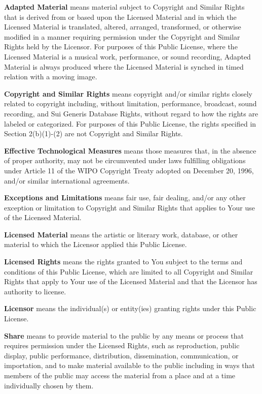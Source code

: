 \begin{doclicense@enumerate}
\item \textbf{Adapted Material} means material subject to Copyright and Similar Rights that is derived from or based upon the Licensed Material and in which the Licensed Material is translated, altered, arranged, transformed, or otherwise modified in a manner requiring permission under the Copyright and Similar Rights held by the Licensor. For purposes of this Public License, where the Licensed Material is a musical work, performance, or sound recording, Adapted Material is always produced where the Licensed Material is synched in timed relation with a moving image.
\item \textbf{Copyright and Similar Rights} means copyright and/or similar rights closely related to copyright including, without limitation, performance, broadcast, sound recording, and Sui Generis Database Rights, without regard to how the rights are labeled or categorized. For purposes of this Public License, the rights specified in Section 2(b)(1)-(2) are not Copyright and Similar Rights.
\item \textbf{Effective Technological Measures} means those measures that, in the absence of proper authority, may not
be circumvented under laws fulfilling obligations under Article 11 of the WIPO Copyright Treaty adopted on December 20, 1996, and/or similar
international agreements.
\item \textbf{Exceptions and Limitations} means fair use, fair dealing, and/or any other exception or limitation to Copyright and Similar Rights that applies to Your use of the Licensed Material.
\item \textbf{Licensed Material} means the artistic or literary work, database, or other material to which the Licensor applied this Public License.
\item \textbf{Licensed Rights} means the rights granted to You subject to the terms and conditions of this Public License, which are limited to all Copyright and Similar Rights that apply to Your use of the Licensed Material and that the Licensor has authority to license.
\item \textbf{Licensor} means the individual(s) or entity(ies) granting rights under this Public License.
\item \textbf{Share} means to provide material to the public by any means or process that requires permission under the Licensed Rights, such as reproduction, public display, public performance, distribution, dissemination, communication, or importation, and to make material available to the public including in ways that members of the public may access the material from a place and at a time individually chosen by them.

\end{doclicense@enumerate}
